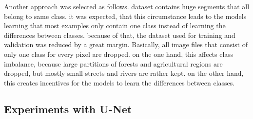 {Another approach was selected as follows. dataset contains huge segments that all belong to same class. it was expected, that this circumstance leads to the models learning that most examples only contain one class instead of learning the differences between classes. because of that, the dataset used for training and validation was reduced by a great margin. Basically, all image files that consist of only one class for every pixel are dropped. on the one hand, this affects class imbalance, because large partitions of forests and agricultural regions are dropped, but mostly small streets and rivers are rather kept. on the other hand, this creates incentives for the models to learn the differences between classes.

}

\subsection{Experiments with U-Net}

